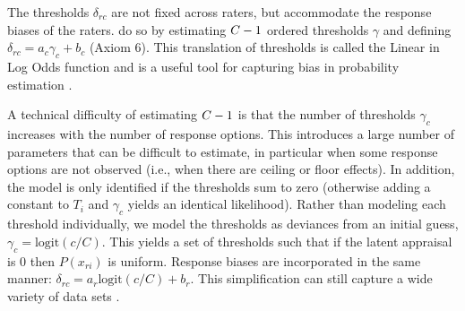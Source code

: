 \documentclass{article}
\newcommand{\Irater}{r}
\newcommand{\Iitem}{i}
\newcommand{\Incat}{c}
\newcommand{\Tncat}{\expandafter\MakeUppercase\expandafter{\Incat}}
\newcommand{\logit}[1]{\text{logit}\left(#1\right)}
\begin{document}
The thresholds $\delta_{\Irater\Incat}$ are not fixed across raters, but accommodate the response biases of the raters.  do so by estimating $\Tncat-1$ ordered thresholds $\gamma$ and defining $\delta_{\Irater\Incat} = a_\Incat \gamma_\Incat + b_\Incat$ (Axiom 6). This translation of thresholds is called the Linear in Log Odds function and is a useful tool for capturing bias in probability estimation \cite{Fox1995, Gonzalez1999, Anders2015cultural}.

A technical difficulty of estimating $\Tncat-1$ is that the number of thresholds $\gamma_\Incat$ increases with the number of response options. This introduces a large number of parameters that can be difficult to estimate, in particular when some response options are not observed (i.e., when there are ceiling or floor effects). In addition, the model is only identified if the thresholds sum to zero (otherwise adding a constant to $T_\Iitem$ and $\gamma_\Incat$ yields an identical likelihood). Rather than modeling each threshold individually, we model the thresholds as deviances from an initial guess, $\gamma_\Incat = \logit{c/C}$. This yields a set of thresholds such that if the latent appraisal is 0 then $P(x_{\Irater\Iitem})$ is uniform. Response biases are incorporated in the same manner: $\delta_{\Irater\Incat} = a_\Irater\logit{c/C} + b_\Irater$. This simplification can still capture a wide variety of data sets \cite{Selker2019}.
\end{document}
